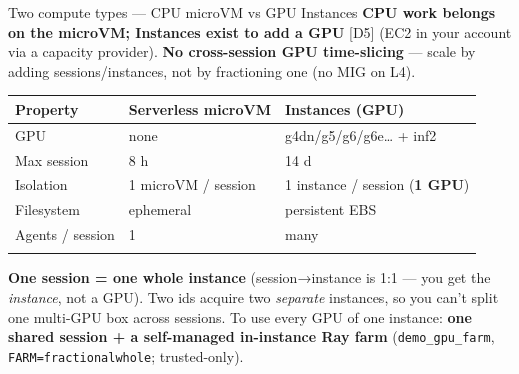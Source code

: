 \documentclass[
  10pt,
  ignorenonframetext,
  aspectratio=169,
  t]{beamer}
\begin{document}
\begin{frame}{Two compute types --- CPU microVM vs GPU
Instances}
\protect\hypertarget{two-compute-types-cpu-microvm-vs-gpu-instances}{}
\textbf{CPU work belongs on the microVM; Instances exist to add a GPU}
{[}D5{]} (EC2 in your account via a capacity provider). \textbf{No
cross-session GPU time-slicing} --- scale by adding sessions/instances,
not by fractioning one (no MIG on L4).

\begin{longtable}[]{@{}lll@{}}
\toprule\noalign{}
Property & Serverless microVM & Instances (GPU) \\
\midrule\noalign{}
\endhead
GPU & none & g4dn/g5/g6/g6e\ldots{} + inf2 \\
Max session & 8 h & 14 d \\
Isolation & 1 microVM / session & 1 instance / session (\textbf{1
GPU}) \\
Filesystem & ephemeral & persistent EBS \\
Agents / session & 1 & many \\
\bottomrule\noalign{}
\end{longtable}

\textbf{One session = one whole instance} (session→instance is 1:1 ---
you get the \emph{instance}, not a GPU). Two ids acquire two
\emph{separate} instances, so you can't split one multi-GPU box across
sessions. To use every GPU of one instance: \textbf{one shared session +
a self-managed in-instance Ray farm} (\texttt{demo\_gpu\_farm},
\texttt{FARM=fractional\textbar{}whole}; trusted-only).
\end{frame}
\end{document}
